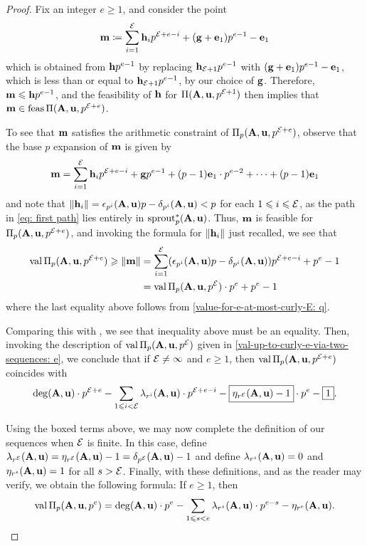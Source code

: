 \documentclass{amsart}
\begin{document}
\begin{proof}
   Fix an integer $e \geq 1$, and consider the point
   \[
      \mathbf{m} \coloneqq \sum_{i=1}^{\mathcal{E}} \mathbf{h}_i p^{\mathcal{E} + e-i} + (\mathbf{g}+\mathbf{e}_1)p^{e-1} - \mathbf{e}_1
   \]
   which is obtained from $\mathbf{h}p^{e-1}$ by replacing $\mathbf{h}_{\mathcal{E}+1}p^{e-1}$ with  $(\mathbf{g}+\mathbf{e}_1)p^{e-1} - \mathbf{e}_1$, which is less than or equal to $\mathbf{h}_{\mathcal{E}+1} p^{e-1}$, by our choice of $\mathbf{g}$.
   Therefore, $\mathbf{m} \leqslant \mathbf{h}p^{e-1}$, and the feasibility of $\mathbf{h}$ for $\Pi(\mathbf{A},\mathbf{u}, p^{\mathcal{E}+1})$ then implies that $\mathbf{m} \in \operatorname{feas} \Pi(\mathbf{A},\mathbf{u}, p^{\mathcal{E}+e})$.

   To see that $\mathbf{m}$ satisfies the arithmetic constraint of $\Pi_p(\mathbf{A},\mathbf{u}, p^{\mathcal{E}+e})$, observe that the base $p$ expansion of $\mathbf{m}$ is given by
   \[
      \mathbf{m} = \sum_{i=1}^{\mathcal{E}} \mathbf{h}_i p^{\mathcal{E} + e-i} + \mathbf{g}p^{e-1} + (p-1) \mathbf{e}_1 \cdot p^{e-2} + \cdots + (p-1)\mathbf{e}_1
   \]
   and note that $\| \mathbf{h}_i \| = \epsilon_{p^i}(\mathbf{A},\mathbf{u})p-\delta_{p^i}(\mathbf{A},\mathbf{u}) < p$ for each $1 \leqslant i \leqslant \mathcal{E}$, as the path in \eqref{eq: first path} lies entirely in $\operatorname{sprout}_p^{\ast}(\mathbf{A},\mathbf{u})$.
   Thus, $\mathbf{m}$ is feasible for $\Pi_p(\mathbf{A},\mathbf{u}, p^{\mathcal{E}+e})$, and invoking the formula for $\| \mathbf{h}_i \|$ just recalled, we see that
   \begin{align*}
     \operatorname{val} \Pi_p(\mathbf{A},\mathbf{u}, p^{\mathcal{E}+e}) \geqslant \| \mathbf{m} \| & = \sum_{i=1}^{\mathcal{E}} (\epsilon_{p^i}(\mathbf{A},\mathbf{u})p-\delta_{p^i}(\mathbf{A},\mathbf{u})) p^{\mathcal{E} + e-i} + p^e-1 \\
         & = \operatorname{val} \Pi_p(\mathbf{A},\mathbf{u}, p^{\mathcal{E}}) \cdot p^e + p^e-1
   \end{align*}
   where the last equality above follows from \eqref{value-for-e-at-most-curly-E: q}.
   
   Comparing this with , we see that inequality above must be an equality.  Then, invoking the description of $\operatorname{val} \Pi_p(\mathbf{A}, \mathbf{u}, p^{\mathcal{E}})$ given in \eqref{val-up-to-curly-e-via-two-sequences: e}, we conclude that if $\mathcal{E} \neq \infty$ and $e \geq 1$, then  $\operatorname{val} \Pi_p(\mathbf{A}, \mathbf{u}, p^{\mathcal{E}+e})$ coincides with
   \[
   \operatorname{deg}(\mathbf{A}, \mathbf{u}) \cdot p^{\mathcal{E}+e} - \sum_{1 \leqslant i < \mathcal{E}} \lambda_{r^i}(\mathbf{A}, \mathbf{u}) \cdot p^{\mathcal{E} + e -i} - \boxed{{\eta_{r^{\mathcal{E}}}(\mathbf{A}, \mathbf{u})}-1} \cdot p^e  - \boxed{1}.  
	\]

Using the boxed terms above, we may now complete the definition of our sequences when $\mathcal{E}$ is finite.  In this case, define $\lambda_{r^{\mathcal{E}}}(\mathbf{A}, \mathbf{u}) =  {\eta_{r^{\mathcal{E}}}(\mathbf{A}, \mathbf{u})}-1 = {\delta_{p^{\mathcal{E}}}(\mathbf{A}, \mathbf{u})}-1$ and define $\lambda_{r^s}(\mathbf{A}, \mathbf{u})= 0$ and $\eta_{r^s}(\mathbf{A}, \mathbf{u}) = 1$ for all $s > \mathcal{E}$.  Finally, with these definitions, and as the reader may verify, we obtain the following formula:  If $e \geq 1$, then
\[
\operatorname{val} \Pi_p(\mathbf{A},\mathbf{u}, p^e) =  \operatorname{deg}(\mathbf{A},\mathbf{u}) \cdot p^e - \sum_{1 \leqslant s < e} \lambda_{r^s}(\mathbf{A}, \mathbf{u}) \cdot  p^{e-s} - \eta_{r^e}(\mathbf{A},\mathbf{u}).
\]


\end{proof}
\end{document}
